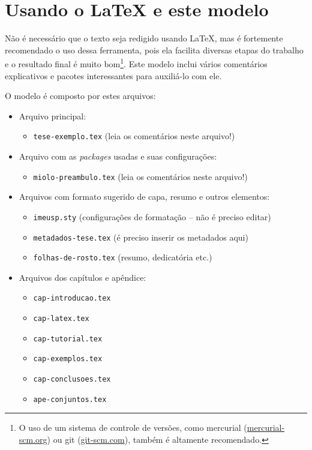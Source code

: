 \chapter{Usando o \LaTeX{} e este modelo}

Não é necessário que o texto seja redigido usando \LaTeX{}, mas é fortemente
recomendado o uso dessa ferramenta, pois ela facilita diversas etapas do
trabalho e o resultado final é muito bom\footnote{O uso de um sistema de
controle de versões, como mercurial (\url{mercurial-scm.org}) ou git
(\url{git-scm.com}), também é altamente recomendado.}. Este modelo inclui
vários comentários explicativos e pacotes interessantes para auxiliá-lo com
ele.

O modelo é composto por estes arquivos:

\begin{itemize}
  \item Arquivo principal:
  \begin{itemize}
    \item \texttt{tese-exemplo.tex} (leia os comentários neste arquivo!)
  \end{itemize}

  \item Arquivo com as \textit{packages} usadas e suas configurações:
  \begin{itemize}
    \item \texttt{miolo-preambulo.tex} (leia os comentários neste arquivo!)
  \end{itemize}

  \item Arquivos com formato sugerido de capa, resumo e outros elementos:
  \begin{itemize}
    \item \texttt{imeusp.sty} (configurações de formatação -- não é preciso editar)
    \item \texttt{metadados-tese.tex} (é preciso inserir os metadados aqui)
    \item \texttt{folhas-de-rosto.tex} (resumo, dedicatória etc.)
  \end{itemize}

  \item Arquivos dos capítulos e apêndice:
  \begin{itemize}
    \item \texttt{cap-introducao.tex}
    \item \texttt{cap-latex.tex}
    \item \texttt{cap-tutorial.tex}
    \item \texttt{cap-exemplos.tex}
    \item \texttt{cap-conclusoes.tex}
    \item \texttt{ape-conjuntos.tex}
  \end{itemize}


\end{itemize}
